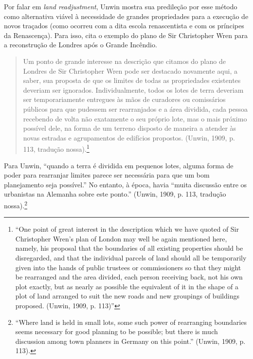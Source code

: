 \documentclass[12pt, a4paper]{book} %
\begin{document}
        Por falar em \textit{land readjustment}, Unwin mostra sua predileção por esse método como alternativa viável à necessidade de grandes propriedades para a execução de novos traçados (como ocorreu com a dita escola renascentista e com os príncipes da Renascença). Para isso, cita o exemplo do plano de Sir Christopher Wren para a reconstrução de Londres após o Grande Incêndio. 

        \begin{quotation}
            Um ponto de grande interesse na descrição que citamos do plano de Londres de Sir Christopher Wren pode ser destacado novamente aqui, a saber, sua proposta de que os limites de todas as propriedades existentes deveriam ser ignorados. Individualmente, todos os lotes de terra deveriam ser temporariamente entregues às mãos de curadores ou comissários públicos para que pudessem ser rearranjados e a área dividida, cada pessoa recebendo de volta não exatamente o seu próprio lote, mas o mais próximo possível dele, na forma de um terreno disposto de maneira a atender às novas estradas e agrupamentos de edifícios propostos.
            (Unwin, 1909, p. 113, tradução nossa).\footnote[32]{``One point of great interest in the description which we have quoted of Sir Christopher Wren's plan of London may well be again mentioned here, namely, his proposal that the boundaries of all existing properties should be disregarded, and that the individual parcels of land should all be temporarily given into the hands of public trustees or commissioners so that they might be rearranged and the area divided, each person receiving back, not his own plot exactly, but as nearly as possible the equivalent of it in the shape of a plot of land arranged to suit the new roads and new groupings of buildings proposed. (Unwin, 1909, p. 113)''}
        \end{quotation}

        Para Unwin, ``quando a terra é dividida em pequenos lotes, alguma forma de poder para rearranjar limites parece ser necessária para que um bom planejamento seja possível.'' No entanto, à época, havia ``muita discussão entre os urbanistas na Alemanha sobre este ponto.'' (Unwin, 1909, p. 113, tradução nossa).\footnote[33]{``Where land is held in small lots, some such power of rearranging boundaries seems necessary for good planning to be possible; but there is much discussion among town planners in Germany on this point.'' (Unwin, 1909, p. 113).} 
        
\end{document}
